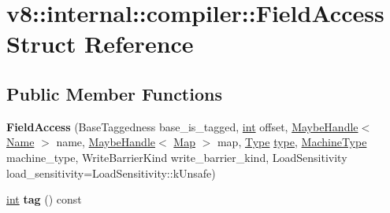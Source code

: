 \hypertarget{structv8_1_1internal_1_1compiler_1_1FieldAccess}{}\section{v8\+:\+:internal\+:\+:compiler\+:\+:Field\+Access Struct Reference}
\label{structv8_1_1internal_1_1compiler_1_1FieldAccess}
\subsection*{Public Member Functions}
\begin{DoxyCompactItemize}
\item 
\mbox{\label{structv8_1_1internal_1_1compiler_1_1FieldAccess_a1119e90182bdd491595075d858b78bd8}} 
{\bfseries Field\+Access} (Base\+Taggedness base\+\_\+is\+\_\+tagged, \mbox{\hyperlink{classint}{int}} offset, \mbox{\hyperlink{classv8_1_1internal_1_1MaybeHandle}{Maybe\+Handle}}$<$ \mbox{\hyperlink{classv8_1_1internal_1_1Name}{Name}} $>$ name, \mbox{\hyperlink{classv8_1_1internal_1_1MaybeHandle}{Maybe\+Handle}}$<$ \mbox{\hyperlink{classv8_1_1internal_1_1Map}{Map}} $>$ map, \mbox{\hyperlink{classv8_1_1internal_1_1compiler_1_1Type}{Type}} \mbox{\hyperlink{classstd_1_1conditional_1_1type}{type}}, \mbox{\hyperlink{classv8_1_1internal_1_1MachineType}{Machine\+Type}} machine\+\_\+type, Write\+Barrier\+Kind write\+\_\+barrier\+\_\+kind, Load\+Sensitivity load\+\_\+sensitivity=Load\+Sensitivity\+::k\+Unsafe)
\item 
\mbox{\label{structv8_1_1internal_1_1compiler_1_1FieldAccess_aadb6b5e4d35b73290b3c1e25a64de120}} 
\mbox{\hyperlink{classint}{int}} {\bfseries tag} () const
\end{DoxyCompactItemize}
